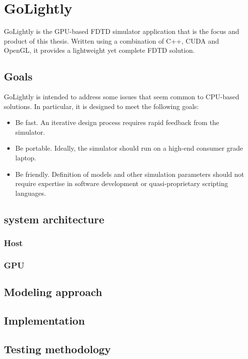 \chapter{GoLightly} \label{ch:golightly}

GoLightly is the GPU-based FDTD simulator application that is the focus and product of this thesis. Written using a combination of C++, CUDA and OpenGL, it provides a lightweight yet complete FDTD solution.

\section{Goals}

GoLightly is intended to address some issues that seem common to CPU-based solutions. In particular, it is designed to meet the following goals:

\begin{itemize}
	\item Be fast. An iterative design process requires rapid feedback from the simulator. 
	\item Be portable. Ideally, the simulator should run on a high-end consumer grade laptop.  
	\item Be friendly. Definition of models and other simulation parameters should not require expertise in software development or quasi-proprietary scripting languages.
\end{itemize}



\section{system architecture}
\subsection{Host}
\subsection{GPU}
\section{Modeling approach}
\section{Implementation}
\section{Testing methodology}

